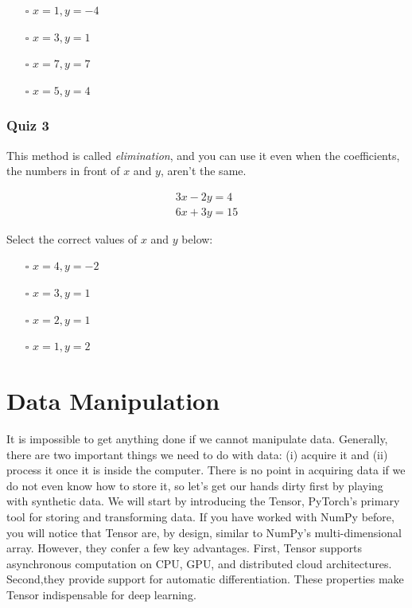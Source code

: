 \documentclass[]{article}
\begin{document}
\begin{itemize}
	\item[$\square$] $ x = 1, y = -4 $
	\item[$\square$] $ x = 3, y = 1 $
	\item[$\square$] $ x = 7, y = 7 $
	\item[$\square$] $ x = 5, y = 4 $
\end{itemize}

\subsubsection{Quiz 3}

This method is called \textit{elimination}, and you can use it even when the coefficients, the numbers in front of $ x $ and $ y $, aren't the same.

\begin{equation} \label{}
\begin{split}
3x - 2y = 4 \\
6x + 3y = 15
\end{split}
\end{equation}

Select the correct values of $ x $ and $ y $ below:

\begin{itemize}
	\item[$\square$] $ x = 4, y = -2 $
	\item[$\square$] $ x = 3, y = 1 $
	\item[$\square$] $ x = 2, y = 1 $
	\item[$\square$] $ x = 1, y = 2 $
\end{itemize}


\section{Data Manipulation}

It is impossible to get anything done if we cannot manipulate data. Generally, there are two important things we need to do with data: (i) acquire it and (ii) process it once it is inside the computer.  There is no point in acquiring data if we do not even know how to store it, so let’s get our hands dirty first by playing with synthetic data. We will start by introducing the Tensor, PyTorch’s primary tool for storing and transforming data.  If you have worked with NumPy before, you will notice that Tensor are, by design, similar to NumPy’s multi-dimensional array.  However, they confer a few key advantages.  First, Tensor supports asynchronous computation on CPU, GPU, and distributed cloud architectures. Second,they provide support for automatic differentiation. These properties make Tensor indispensable for deep learning.
\end{document}
